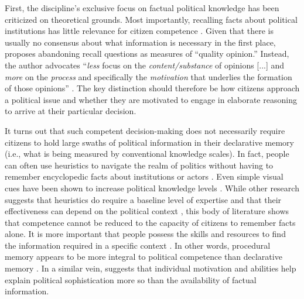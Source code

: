 First, the discipline's exclusive focus on factual political knowledge has been criticized on theoretical grounds. Most importantly, recalling facts about political institutions  has little relevance for citizen competence \citep{lupia2006elitism,cramer2017fact}. Given that there is usually no consensus about what information is necessary in the first place, \citet{druckman2014pathologies} proposes abandoning recall questions as measures of ``quality opinion.'' Instead, the author advocates ``\textit{less} focus on the \textit{content/substance} of opinions [...] and \textit{more} on the \textit{process} and specifically the \textit{motivation} that underlies the formation of those opinions'' \citeyearpar[478, emphasis in the original]{druckman2014pathologies}. The key distinction should therefore be how citizens approach a political issue and whether they are motivated to engage in elaborate reasoning to arrive at their particular decision.

It turns out that such competent decision-making does not necessarily require citizens to hold large swaths of political information in their declarative memory (i.e., what is being measured by conventional knowledge scales). In fact, people can often use heuristics to navigate the realm of politics without having to remember encyclopedic facts about institutions or actors \citep{lupia1994shortcuts}. Even simple visual cues have been shown to increase political knowledge levels \citep{prior2014visual}. While other research suggests that heuristics do require a baseline level of expertise \citep{lau2001advantages,lau2008exploration} and that their effectiveness can depend on the political context \citep{dancey2013heuristics}, this body of literature shows that competence cannot be reduced to the capacity of citizens to remember facts alone. It is more important that people possess the skills and resources to find the information required in a specific context \citep[e.g.,][]{bernhard2020more}. In other words, procedural memory appears to be more integral to political competence than declarative memory \citep{prior2008money}. In a similar vein, \citet{luskin1990explaining} suggests that individual motivation and abilities help explain political sophistication more so than the availability of factual information.

